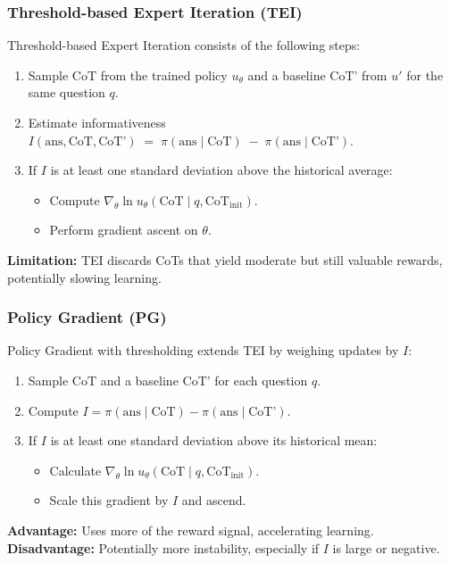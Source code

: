 \documentclass{article}
\begin{document}
\subsubsection{Threshold-based Expert Iteration (TEI)}
\label{subsubsec:tei}
Threshold-based Expert Iteration consists of the following steps:
\begin{enumerate}
    \item Sample $\text{CoT}$ from the trained policy $u_\theta$ and a baseline $\text{CoT'}$ from $u'$ for the same question $q$.
    \item Estimate informativeness $I(\text{ans}, \text{CoT}, \text{CoT'}) \;=\; \pi(\text{ans}\mid \text{CoT}) \;-\; \pi(\text{ans}\mid \text{CoT'})$.
    \item If $I$ is at least one standard deviation above the historical average:
\begin{itemize}
            \item Compute $\nabla_\theta \ln u_\theta(\text{CoT} \mid q, \text{CoT}_{\text{init}})$.
            \item Perform gradient ascent on $\theta$.
\end{itemize}
\end{enumerate}
\noindent
\textbf{Limitation:} TEI discards CoTs that yield moderate but still valuable rewards, potentially slowing learning.

\subsubsection{Policy Gradient (PG)}
\label{subsubsec:pg}
Policy Gradient with thresholding extends TEI by weighing updates by $I$:
\begin{enumerate}
    \item Sample $\text{CoT}$ and a baseline $\text{CoT'}$ for each question $q$.
    \item Compute $I = \pi(\text{ans}\mid \text{CoT}) - \pi(\text{ans}\mid \text{CoT'})$.
    \item If $I$ is at least one standard deviation above its historical mean:
\begin{itemize}
            \item Calculate $\nabla_\theta \ln u_\theta(\text{CoT} \mid q, \text{CoT}_{\text{init}})$.
            \item Scale this gradient by $I$ and ascend.
\end{itemize} 
\end{enumerate}
\noindent
\textbf{Advantage:} Uses more of the reward signal, accelerating learning. \\
\textbf{Disadvantage:} Potentially more instability, especially if $I$ is large or negative.
\end{document}
